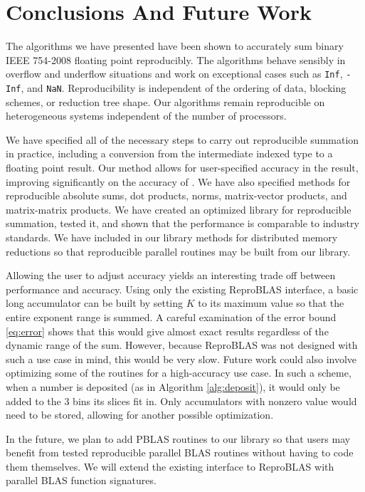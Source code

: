 \section{Conclusions And Future Work}
  The algorithms we have presented have been shown to accurately sum binary IEEE 754-2008 floating point reproducibly. The algorithms behave sensibly in overflow and underflow situations and work on exceptional cases such as \texttt{Inf}, \texttt{-Inf}, and \texttt{NaN}. Reproducibility is independent of the ordering of data, blocking schemes, or reduction tree shape. Our algorithms remain reproducible on heterogeneous systems independent of the number of processors.

   We have specified all of the necessary steps to carry out reproducible summation in practice, including a conversion from the intermediate indexed type to a floating point result. Our method allows for user-specified accuracy in the result, improving significantly on the accuracy of \cite{repsum}. We have also specified methods for reproducible absolute sums, dot products, norms, matrix-vector products, and matrix-matrix products. We have created an optimized library for reproducible summation, tested it, and shown that the performance is comparable to industry standards. We have included in our library methods for distributed memory reductions so that reproducible parallel routines may be built from our library.

  Allowing the user to adjust accuracy yields an interesting trade off between performance and accuracy. Using only the existing ReproBLAS interface, a basic long accumulator can be built by setting $K$ to its maximum value so that the entire exponent range is summed. A careful examination of the error bound \eqref{eq:error} shows that this would give almost exact results regardless of the dynamic range of the sum. However, because ReproBLAS was not designed with such a use case in mind, this would be very slow. Future work could also involve optimizing some of the routines for a high-accuracy use case. In such a scheme, when a number is deposited (as in Algorithm \ref{alg:deposit}), it would only be added to the 3 bins its slices fit in. Only accumulators with nonzero value would need to be stored, allowing for another possible optimization.

  In the future, we plan to add PBLAS routines to our library so that users may benefit from tested reproducible parallel BLAS routines without having to code them themselves. We will extend the existing interface to ReproBLAS with parallel BLAS function signatures.
